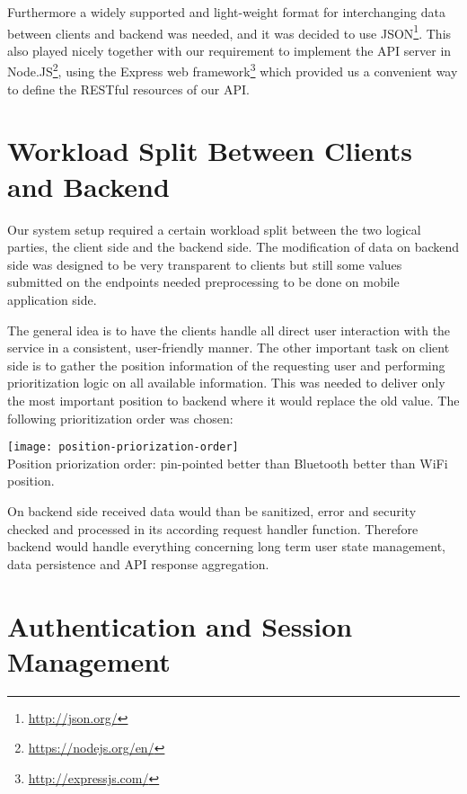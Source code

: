 Furthermore a widely supported and light-weight format for interchanging data between clients and backend was needed, and it was decided to use JSON\footnote{\url{http://json.org/}}. This also played nicely together with our requirement to implement the API server in Node.JS\footnote{\url{https://nodejs.org/en/}}, using the Express web framework\footnote{\url{http://expressjs.com/}} which provided us a convenient way to define the RESTful resources of our API.


\vspace{0.5cm}

\section{Workload Split Between Clients and Backend}

Our system setup required a certain workload split between the two logical parties, the client side and the backend side. The modification of data on backend side was designed to be very transparent to clients but still some values submitted on the endpoints needed preprocessing to be done on mobile application side.

The general idea is to have the clients handle all direct user interaction with the service in a consistent, user-friendly manner. The other important task on client side is to gather the position information of the requesting user and performing prioritization logic on all available information. This was needed to deliver only the most important position to backend where it would replace the old value. The following prioritization order was chosen:
\begin{center}
    \texttt{[image: position-priorization-order]}\\
    Position priorization order: pin-pointed better than Bluetooth better than WiFi position.
    \label{fig:position-priorization}
\end{center}

On backend side received data would than be sanitized, error and security checked and processed in its according request handler function. Therefore backend would handle everything concerning long term user state management, data persistence and API response aggregation.


\vspace{0.5cm}

\section{Authentication and Session Management}
\label{concept-authentication}

